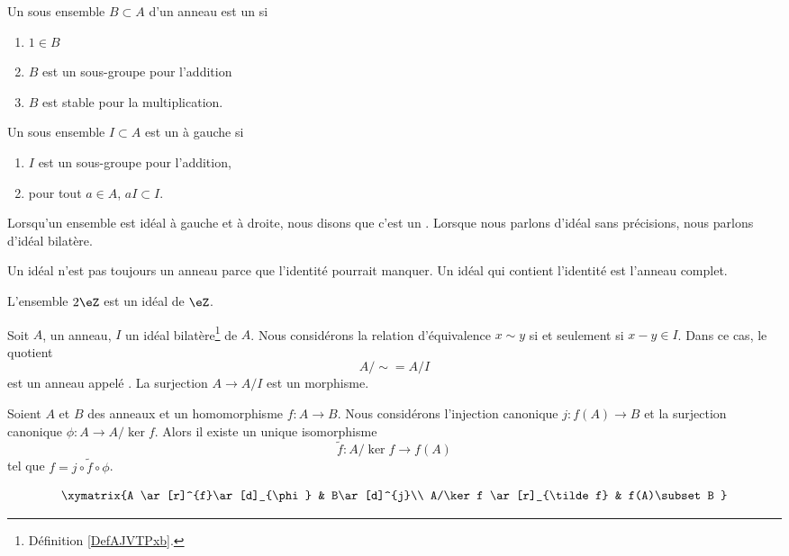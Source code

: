 \begin{definition}  \label{DefAJVTPxb}
    Un sous ensemble \( B\subset A\) d'un anneau est un  si
    \begin{enumerate}
        \item
            \( 1\in B\)
        \item
            \( B\) est un sous-groupe pour l'addition
        \item
            \( B\) est stable pour la multiplication.
    \end{enumerate}
    Un sous ensemble \( I\subset A\) est un  à gauche si
    \begin{enumerate}
        \item
            \( I\) est un sous-groupe pour l'addition,
        \item
            pour tout \( a\in A\), \( aI\subset I\).
    \end{enumerate}
\end{definition}
Lorsqu'un ensemble est idéal à gauche et à droite, nous disons que c'est un . Lorsque nous parlons d'idéal sans précisions, nous parlons d'idéal bilatère.

\begin{remark}
    Un idéal n'est pas toujours un anneau parce que l'identité pourrait manquer. Un idéal qui contient l'identité est l'anneau complet.
\end{remark}

\begin{example}
    L'ensemble \( 2\eZ\) est un idéal de \( \eZ\).
\end{example}

Soit \( A\), un anneau, \( I\) un idéal bilatère\footnote{Définition \ref{DefAJVTPxb}.} de \( A\). Nous considérons la relation d'équivalence \( x\sim y\) si et seulement si \( x-y\in I\). Dans ce cas, le quotient
\begin{equation}
    A/\sim=A/I
\end{equation}
est un anneau appelé . La surjection \( A\to A/I\) est un morphisme.

\begin{proposition}
    Soient \( A\) et \( B\) des anneaux et un homomorphisme \( f\colon A\to B\). Nous considérons l'injection canonique \( j\colon f(A)\to B\) et la surjection canonique \( \phi\colon A\to A/\ker f\). Alors il existe un unique isomorphisme
    \begin{equation}
        \tilde f \colon A/\ker f\to f(A)
    \end{equation}
    tel que \( f=j\circ\tilde f\circ\phi\).

    \begin{equation}
        \xymatrix{%
        A \ar[r]^{f}\ar[d]_{\phi}        &   B\ar[d]^{j}\\
           A/\ker f \ar[r]_{\tilde f}   &   f(A)\subset B
           }
    \end{equation}
\end{proposition}

